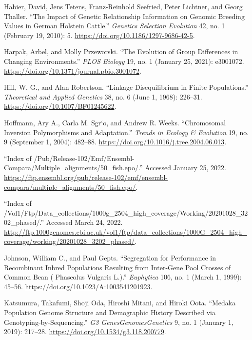 \documentclass[
]{book}
\newlength{\cslhangindent}
\newlength{\cslentryspacingunit} %
\newenvironment{CSLReferences}[2] %
 {%
  \setlength{\parindent}{0pt}
  \ifodd #1
  \let\oldpar\par
  \def\par{\hangindent=\cslhangindent\oldpar}
  \fi
  \setlength{\parskip}{#2\cslentryspacingunit}
 }%
 {}
\begin{document}
\begin{CSLReferences}{1}{0}
\leavevmode{}%
Habier, David, Jens Tetens, Franz-Reinhold Seefried, Peter Lichtner, and Georg Thaller. {``The Impact of Genetic Relationship Information on Genomic Breeding Values in {German Holstein} Cattle.''} \emph{Genetics Selection Evolution} 42, no. 1 (February 19, 2010): 5. \url{https://doi.org/10.1186/1297-9686-42-5}.

\leavevmode{}%
Harpak, Arbel, and Molly Przeworski. {``The Evolution of Group Differences in Changing Environments.''} \emph{PLOS Biology} 19, no. 1 (January 25, 2021): e3001072. \url{https://doi.org/10.1371/journal.pbio.3001072}.

\leavevmode{}%
Hill, W. G., and Alan Robertson. {``Linkage Disequilibrium in Finite Populations.''} \emph{Theoretical and Applied Genetics} 38, no. 6 (June 1, 1968): 226--31. \url{https://doi.org/10.1007/BF01245622}.

\leavevmode{}%
Hoffmann, Ary A., Carla M. Sgr`o, and Andrew R. Weeks. {``Chromosomal Inversion Polymorphisms and Adaptation.''} \emph{Trends in Ecology \& Evolution} 19, no. 9 (September 1, 2004): 482--88. \url{https://doi.org/10.1016/j.tree.2004.06.013}.

\leavevmode{}%
{``Index of /Pub/Release-102/Emf/Ensembl-Compara/Multiple\_alignments/50\_fish.epo/.''} Accessed January 25, 2022. \url{https://ftp.ensembl.org/pub/release-102/emf/ensembl-compara/multiple_alignments/50_fish.epo/}.

\leavevmode{}%
{``Index of /Vol1/Ftp/Data\_collections/{1000g}\_2504\_high\_coverage/Working/20201028\_3202\_phased/.''} Accessed March 24, 2022. \url{http://ftp.1000genomes.ebi.ac.uk/vol1/ftp/data_collections/1000G_2504_high_coverage/working/20201028_3202_phased/}.

\leavevmode{}%
Johnson, William C., and Paul Gepts. {``Segregation for Performance in Recombinant Inbred Populations Resulting from Inter-Gene Pool Crosses of Common Bean ( {Phaseolus} Vulgaris {L}.).''} \emph{Euphytica} 106, no. 1 (March 1, 1999): 45--56. \url{https://doi.org/10.1023/A:1003541201923}.

\leavevmode{}%
Katsumura, Takafumi, Shoji Oda, Hiroshi Mitani, and Hiroki Oota. {``Medaka {Population Genome Structure} and {Demographic History Described} via {Genotyping-by-Sequencing}.''} \emph{G3 Genes\textbar Genomes\textbar Genetics} 9, no. 1 (January 1, 2019): 217--28. \url{https://doi.org/10.1534/g3.118.200779}.


\end{CSLReferences}
\end{document}
